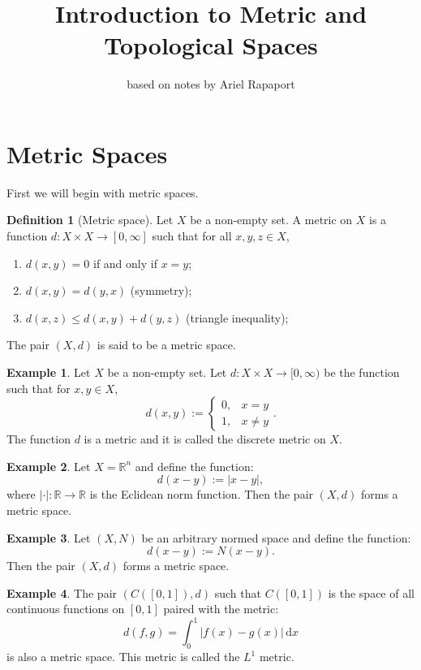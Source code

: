 \documentclass[11pt,a4paper]{article}
\title{\textbf{Introduction to Metric and Topological Spaces}}
\author{based on notes by Ariel Rapaport}
\date{}
\theoremstyle{definition}
\newtheorem{definition}{Definition}[section]
\newtheorem{example}{Example}[section]
\theoremstyle{plain}
\newcommand\dx    {\,\mathrm{d}x}
\newcommand{\R}{\mathbb{R}}
\newcommand{\abs}[1]{\left\lvert #1\right\rvert}
\begin{document}
  \maketitle
  \newpage
  \section{Metric Spaces}\label{sec:metric-spaces}
  First we will begin with metric spaces.
  \begin{definition}[Metric space]
  Let $X$ be a non-empty set. A metric on $X$ is a function 
  $d \colon X \times X \to [0,\infty]$ such that for all $x,y,z \in X$,
  \end{definition}
  \begin{enumerate}
    \item[(1)] $d(x,y) = 0$ if and only if $x = y$;
    \item[(2)] $d(x,y) = d(y,x)$ (symmetry);
    \item[(3)] $d(x,z) \le d(x,y) + d(y,z)$ (triangle inequality);
  \end{enumerate}
  The pair $(X,d)$ is said to be a metric space.
  \begin{example}
  Let $X$ be a non-empty set. Let $d \colon X \times X \to [0,\infty)$ be
  the function such that for $x,y \in X$,
  \[
    d(x,y) := \begin{cases}
      0, & x=y \\
      1, & x \neq y
    \end{cases}.
  \]
  The function $d$ is a metric and it is called the discrete metric on $X$.
  \end{example}
  \begin{example}
  Let $X = \R^n$ and define the function:
  \[
    d(x - y) := \abs{x - y},
  \]
  where $\abs{\cdot} \colon \R \to \R$ is the Eclidean norm function. 
  Then the pair $(X, d)$ forms a metric space.
  \end{example}
  \begin{example}
  Let $(X, N)$ be an arbitrary normed space and define the function:
  \[
    d(x - y) := N(x - y).
  \] 
  Then the pair $(X, d)$ forms a metric space.
  \end{example}
  \begin{example}
  The pair $(C\left([0,1]\right), d)$ such that $C([0,1])$ is the space of 
  all continuous functions on $[0,1]$ paired with the metric:
  \[
    d(f,g) = \int_{0}^{1}{\abs{f(x) - g(x)}\dx}
  \]
  is also a metric space. This metric is called the $L^1$ metric.
  \end{example}
  
\end{document}
